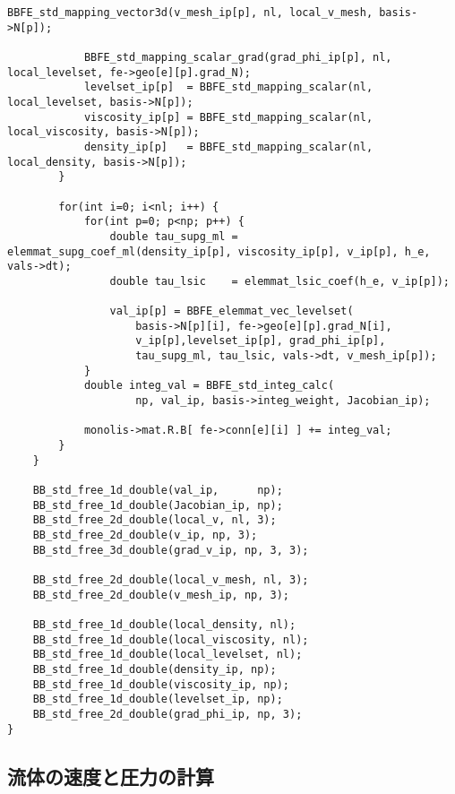 \begin{lstlisting}[caption = mlflow\_fs.cの中のレベルセット関数の右辺ベクトルを計算する関数]
			BBFE_std_mapping_vector3d(v_mesh_ip[p], nl, local_v_mesh, basis->N[p]);

			BBFE_std_mapping_scalar_grad(grad_phi_ip[p], nl, local_levelset, fe->geo[e][p].grad_N);
			levelset_ip[p]  = BBFE_std_mapping_scalar(nl, local_levelset, basis->N[p]);
			viscosity_ip[p] = BBFE_std_mapping_scalar(nl, local_viscosity, basis->N[p]);
			density_ip[p]   = BBFE_std_mapping_scalar(nl, local_density, basis->N[p]);
		}

		for(int i=0; i<nl; i++) {
			for(int p=0; p<np; p++) {
				double tau_supg_ml = elemmat_supg_coef_ml(density_ip[p], viscosity_ip[p], v_ip[p], h_e, vals->dt);
				double tau_lsic    = elemmat_lsic_coef(h_e, v_ip[p]);

				val_ip[p] = BBFE_elemmat_vec_levelset(
					basis->N[p][i], fe->geo[e][p].grad_N[i], 
					v_ip[p],levelset_ip[p], grad_phi_ip[p],
					tau_supg_ml, tau_lsic, vals->dt, v_mesh_ip[p]);
			}
			double integ_val = BBFE_std_integ_calc(
					np, val_ip, basis->integ_weight, Jacobian_ip);

			monolis->mat.R.B[ fe->conn[e][i] ] += integ_val;
		}
	}
	
	BB_std_free_1d_double(val_ip,      np);
	BB_std_free_1d_double(Jacobian_ip, np);
	BB_std_free_2d_double(local_v, nl, 3);
	BB_std_free_2d_double(v_ip, np, 3);
	BB_std_free_3d_double(grad_v_ip, np, 3, 3);

	BB_std_free_2d_double(local_v_mesh, nl, 3);
	BB_std_free_2d_double(v_mesh_ip, np, 3);

	BB_std_free_1d_double(local_density, nl);
	BB_std_free_1d_double(local_viscosity, nl);
	BB_std_free_1d_double(local_levelset, nl);
	BB_std_free_1d_double(density_ip, np);
	BB_std_free_1d_double(viscosity_ip, np);
	BB_std_free_1d_double(levelset_ip, np);
	BB_std_free_2d_double(grad_phi_ip, np, 3);
}
\end{lstlisting}

\subsection{流体の速度と圧力の計算}

